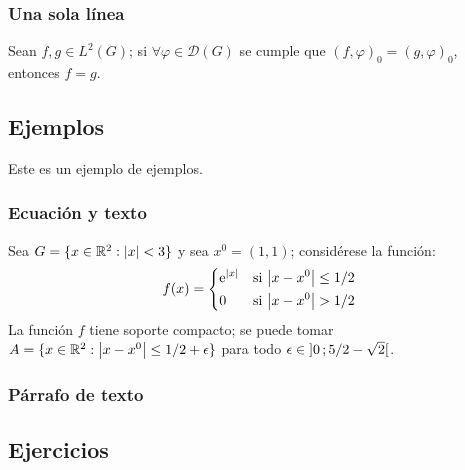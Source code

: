 \subsubsection{Una sola línea}

\begin{proposition} 
	Sean $f,g\in L^2(G)$; si $\forall \varphi\in\mathcal{D}(G)$ se cumple que $(f,\varphi)_0=(g,\varphi)_0$, entonces $f = g$. 
\end{proposition}


\subsection{Ejemplos}

Este es un ejemplo de ejemplos.

\subsubsection{Ecuación y texto}

\begin{example}
	Sea $G=\{x\in\mathbb{R}^2:\abs{x}<3\}$ y sea $x^0=(1,1)$; considérese la función:
	\begin{equation}
		f(x)=\left\{\begin{aligned} 
			& \mathrm{e}^{\abs{x}} & & \text{si $\abs{x-x^0}\leq 1/2$}\\
			& 0 & & \text{si $\abs{x-x^0}> 1/2$}
		\end{aligned}\right.
	\end{equation}
	La función $f$ tiene soporte compacto; se puede tomar $A=\{x\in\mathbb{R}^2:\abs{x-x^0}\leq 1/2+\epsilon\}$ para todo $\epsilon\in\mathopen{]}0\,;5/2-\sqrt{2}\mathclose{[}$.
\end{example}

\subsubsection{Párrafo de texto}

\begin{example}
	\lipsum[2]
\end{example}



\subsection{Ejercicios}

